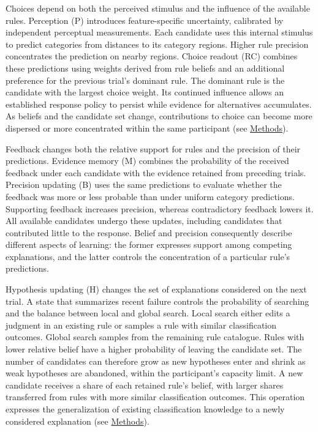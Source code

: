 Choices depend on both the perceived stimulus and the influence of the
available rules. Perception (P) introduces feature-specific uncertainty,
calibrated by independent perceptual measurements. Each candidate uses this
internal stimulus to predict categories from distances to its category
regions. Higher rule precision concentrates the prediction on nearby
regions. Choice readout (RC) combines these predictions using weights
derived from rule beliefs and an additional preference for the previous
trial's dominant rule. The dominant rule is the candidate with the largest
choice weight. Its continued influence allows an established response policy
to persist while evidence for alternatives accumulates. As beliefs and the
candidate set change, contributions to choice can become more dispersed or
more concentrated within the same participant (see \hyperref[m:choice]{Methods}).

Feedback changes both the relative support for rules and the precision of
their predictions. Evidence memory (M) combines the probability of the
received feedback under each candidate with the evidence retained from
preceding trials. Precision updating (B) uses the same predictions to
evaluate whether the feedback was more or less probable than under uniform
category predictions. Supporting feedback increases precision, whereas
contradictory feedback lowers it. All available candidates undergo these
updates, including candidates that contributed little to the response.
Belief and precision consequently describe different aspects of learning:
the former expresses support among competing explanations, and the latter
controls the concentration of a particular rule's predictions.

Hypothesis updating (H) changes the set of explanations considered on the
next trial. A state that summarizes recent failure controls the probability
of searching and the balance between local and global search. Local search
either edits a judgment in an existing rule or samples a rule with similar
classification outcomes. Global search samples from the remaining rule
catalogue. Rules with lower relative belief have a higher probability of
leaving the candidate set. The number of candidates can therefore grow as
new hypotheses enter and shrink as weak hypotheses are abandoned, within
the participant's capacity limit. A new candidate receives a share of each
retained rule's belief, with larger shares transferred from rules with more
similar classification outcomes. This operation expresses the
generalization of existing classification knowledge to a newly considered
explanation (see \hyperref[m:hypothesis]{Methods}).

